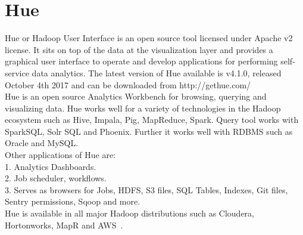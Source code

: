 \section{Hue}

Hue or Hadoop User Interface is an open source tool licensed 
under Apache v2 license. It sits on top of the data at the 
visualization layer and provides a graphical user interface to 
operate and develop applications for performing self-service 
data analytics.
The latest version of Hue available is v4.1.0, released October 
4th 2017 and can be downloaded from http://gethue.com/
~\cite{hid-sp18-517-hue-apache} \\

Hue is an open source Analytics Workbench for browsing, querying 
and visualizing data.
Hue works well for a variety of technologies in the Hadoop 
ecosystem such as Hive, Impala, Pig, MapReduce, Spark. Query 
tool works with SparkSQL, Solr SQL and Phoenix. Further it works 
well with RDBMS such as Oracle and MySQL. \\

Other applications of Hue are: \\

1. Analytics Dashboards. \\
2. Job scheduler, workflows. \\
3. Serves as browsers for Jobs, HDFS, S3 files, SQL Tables, Indexes, 
Git files, Sentry permissions, Sqoop and more. \\

Hue is available in all major Hadoop distributions such as Cloudera, 
Hortonworks, MapR and AWS~\cite{hid-sp18-517-Hue-wiki}.

